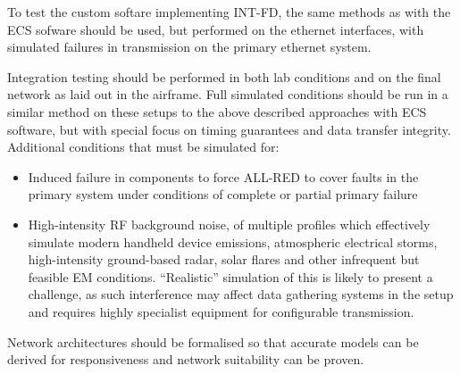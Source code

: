 
To test the custom softare implementing INT-FD, the same methods as with the ECS sofware should be used, but performed on the ethernet interfaces, with simulated failures in transmission on the primary ethernet system.

Integration testing should be performed in both lab conditions and on the final network as laid out in the airframe.
Full simulated conditions should be run in a similar method on these setups to the above described approaches with ECS software, but with special focus on timing guarantees and data transfer integrity.
Additional conditions that must be simulated for:\begin{itemize}
    \item Induced failure in components to force ALL-RED to cover faults in the primary system under conditions of complete or partial primary failure
    \item High-intensity RF background noise, of multiple profiles which effectively simulate modern handheld device emissions, atmospheric electrical storms, high-intensity ground-based radar, solar flares and other infrequent but feasible EM conditions.
    ``Realistic'' simulation of this is likely to present a challenge, as such interference may affect data gathering systems in the setup and requires highly specialist equipment for configurable transmission.
\end{itemize}

Network architectures should be formalised so that accurate models can be derived for responsiveness and network suitability can be proven.
